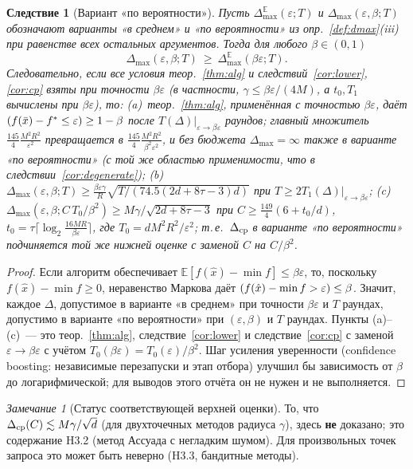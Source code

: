\documentclass[11pt,a4paper]{article}
\numberwithin{equation}{section}
\newtheorem{corollary}[theorem]{Следствие}
\theoremstyle{definition}
\theoremstyle{remark}
\newtheorem{remark}[theorem]{Замечание}
\newcommand{\E}{\mathbb E}\newcommand{\R}{\mathbb R}\newcommand{\N}{\mathbb N}\let\Prob\relax\newcommand{\Prob}{\mathbb P}
\newcommand{\Dmax}{\Delta_{\max}}\newcommand{\Dcp}{\Delta_{\rm cp}}
\begin{document}
\begin{corollary}[Вариант «по вероятности»]\label{cor:prob}
Пусть $\Dmax^{\E}(\varepsilon;T)$ и $\Dmax(\varepsilon,\beta;T)$ обозначают варианты «в среднем» и «по вероятности» из опр.~\ref{def:dmax}(iii) при равенстве всех остальных аргументов. Тогда для любого $\beta\in(0,1)$
\[\Dmax(\varepsilon,\beta;T)\ \ge\ \Dmax^{\E}(\beta\varepsilon;T).\]
Следовательно, если все условия теор.~\ref{thm:alg} и следствий~\ref{cor:lower}, \ref{cor:cp} взяты при точности $\beta\varepsilon$ (в частности, $\gamma\le\beta\varepsilon/(4M)$, а $t_0,T_1$ вычислены при $\beta\varepsilon$), то:
(a)~теор.~\ref{thm:alg}, применённая с точностью $\beta\varepsilon$, даёт $\Prob(f(\bar x)-f^*\le\varepsilon)\ge1-\beta$ после $T(\Delta)|_{\varepsilon\to\beta\varepsilon}$ раундов; главный множитель $\frac{145}4\frac{M^2R^2}{\varepsilon^2}$ превращается в $\frac{145}4\frac{M^2R^2}{\beta^2\varepsilon^2}$, и без бюджета $\Dmax=\infty$ также в варианте «по вероятности» (с той же областью применимости, что в следствии~\ref{cor:degenerate});
(b)~$\Dmax(\varepsilon,\beta;T)\ge\frac{\beta\varepsilon\gamma}R\sqrt{T/(74.5(2d+8\tau-3)d)}$ при $T\ge2T_1(\Delta)|_{\varepsilon\to\beta\varepsilon}$;
(c)~$\Dmax(\varepsilon,\beta;C\,T_0/\beta^2)\ge M\gamma/\sqrt{2d+8\tau-3}$ при $C\ge\frac{149}4(6+t_0/d)$, $t_0=\tau\lceil\log_2\frac{16MR}{\beta\varepsilon}\rceil$, где $T_0=dM^2R^2/\varepsilon^2$; т.\,е.\ $\Dcp$ в варианте «по вероятности» подчиняется той же нижней оценке с заменой $C$ на $C/\beta^2$.
\end{corollary}
\begin{proof}
Если алгоритм обеспечивает $\E[f(\hat x)-\min f]\le\beta\varepsilon$, то, поскольку $f(\hat x)-\min f\ge0$, неравенство Маркова даёт $\Prob(f(\hat x)-\min f>\varepsilon)\le\beta$. Значит, каждое $\Delta$, допустимое в варианте «в среднем» при точности $\beta\varepsilon$ и $T$ раундах, допустимо в варианте «по вероятности» при $(\varepsilon,\beta)$ и $T$ раундах. Пункты (a)--(c)~--- это теор.~\ref{thm:alg}, следствие~\ref{cor:lower} и следствие~\ref{cor:cp} с заменой $\varepsilon\to\beta\varepsilon$ с учётом $T_0(\beta\varepsilon)=T_0(\varepsilon)/\beta^2$. Шаг усиления уверенности (confidence boosting: независимые перезапуски и этап отбора) улучшил бы зависимость от $\beta$ до логарифмической; для выводов этого отчёта он не нужен и не выполняется.
\end{proof}

\begin{remark}[Статус соответствующей верхней оценки]
То, что $\Dcp(C)\lesssim M\gamma/\sqrt d$ (для двухточечных методов радиуса $\gamma$), здесь \textbf{не} доказано; это содержание H3.2 (метод Ассуада с негладким шумом). Для произвольных точек запроса это может быть неверно (H3.3, бандитные методы).
\end{remark}
\end{document}
